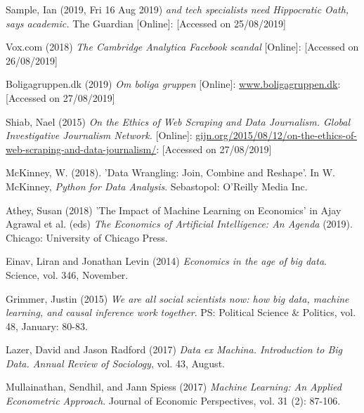 \documentclass[12pt,a4paper]{article}
\begin{document}
Sample, Ian (2019, Fri 16 Aug 2019) \textit{and tech specialists need Hippocratic Oath, says academic.} The Guardian [Online]: \href{https://www.theguardian.com/science/2019/aug/16/mathematicians-need-doctor-style-hippocratic-oath-says-academic-hannah-fry} [Accessed on 25/08/2019]\newline

Vox.com (2018) \textit{The Cambridge Analytica Facebook scandal} [Online]: \href{https://www.vox.com/2018/4/10/17207394/cambridge-analytica-facebook-zuckerberg-trump-privacy-scandal} [Accessed on 26/08/2019] \newline
 
Boligagruppen.dk (2019) \textit{Om boliga gruppen} [Online]: \href{https://www.boligagruppen.dk}{www.boligagruppen.dk}: [Accessed on 27/08/2019] \newline

Shiab, Nael (2015) \textit{On the Ethics of Web Scraping and Data Journalism. Global Investigative Journalism Network.} [Online]: \href{https://gijn.org/2015/08/12/on-the-ethics-of-web-scraping-and-data-journalism/}{gijn.org/2015/08/12/on-the-ethics-of-web-scraping-and-data-journalism/}: [Accessed on 27/08/2019] \newline

McKinney, W. (2018). 'Data Wrangling: Join, Combine and Reshape'. In W. McKinney, \textit{Python for Data Analysis}. Sebastopol: O'Reilly Media Inc. \newline

Athey, Susan (2018) 'The Impact of Machine Learning on Economics' in Ajay Agrawal et al. (eds) \textit{The Economics of Artificial Intelligence: An Agenda} (2019). Chicago: University of Chicago Press. \newline

Einav, Liran and Jonathan Levin (2014) \textit{Economics in the age of big data}. Science, vol. 346, November. \newline

Grimmer, Justin (2015) \textit{We are all social scientists now: how big data, machine learning, and causal inference work together}. PS: Political Science \& Politics, vol. 48, January: 80-83. \newline

Lazer, David and Jason Radford (2017) \textit{Data ex Machina. Introduction to Big Data. Annual Review of Sociology}, vol. 43, August. \newline

Mullainathan, Sendhil, and Jann Spiess (2017) \textit{Machine Learning: An Applied Econometric Approach}. Journal of Economic Perspectives, vol. 31 (2): 87-106. \newline
\end{document}

